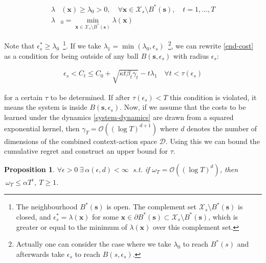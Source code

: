 \documentclass[10pt,a4paper]{article}
\newcommand{\state}{\mathbf{x}} %
\newcommand{\traj}{\mathbf{s}} %
\newtheorem{prop}{Proposition}[section]
\begin{document}
\begin{align}
\lambda&(\state) \geq \lambda_0 > 0, \quad \forall \state \in \mathcal{X}_s \setminus B^{*}(\traj), \quad t = 1, \ldots, T 
\label{optim-advance} \\
\lambda&_0 = \min\limits_{\state \in \mathcal{X}_s \setminus B^{*}(\traj)} \lambda(\state)
\end{align}

Note that $\epsilon_{s}^{*} \geq \lambda_0$~\footnote{The neighbourhood $B^{*}(\traj)$ is open. The complement set $\mathcal{X}_s \setminus B^{*}(\traj)$ is closed, and $\epsilon^{*}_{s} = \lambda(\state)$ for some $\state \in \partial B^{*}(\traj) \subset \mathcal{X}_s \setminus B^{*}(\traj)$, which is greater or equal to the minimum of $\lambda(\state)$ over this complement set.}. If we take $\lambda_1 = \min(\lambda_0, \epsilon_s)$~\footnote{Actually one can consider the case where we take $\lambda_0$ to reach $B^{*}(s)$ and afterwards take $\epsilon_s$ to reach $B(s, \epsilon_s)$.}, we can rewrite \eqref{end-cost} as a condition for being outside of any ball $B(\traj, \epsilon_s)$ with radius $\epsilon_{s}$:

\begin{align}
\epsilon_{s} < C_{t} \leq  C_{0} + \sqrt{\kappa t \beta_{t} \gamma_{t}} - t\lambda_1 \quad \forall t < \tau(\epsilon_s) \label{end-cost-2}
\end{align}

for a certain $\tau$ to be determined. If after $\tau(\epsilon_{s}) < T$ this condition is violated, it means the system is inside $B(\traj, \epsilon_s)$. Now, if we assume that the costs to be learned under the dynamics \eqref{system-dynamics} are drawn from a squared exponential kernel, then $\gamma_T = \mathcal{O}((\log T)^{d+1})$ where $d$ denotes the number of dimensions of the combined context-action space $\mathcal{D}$. Using this we can bound the cumulative regret and construct an upper bound for $\tau$. \\

\begin{prop}
$\forall \epsilon > 0 \ \exists \ \alpha(\epsilon, d) < \infty \ $ s.t. if $\omega_T = \mathcal{O}((\log T)^{d})$, then $\ \omega_{T} \leq \alpha T^{\epsilon}, \ T \geq 1$.  \label{gamma-bound} \\
\end{prop}
\end{document}
